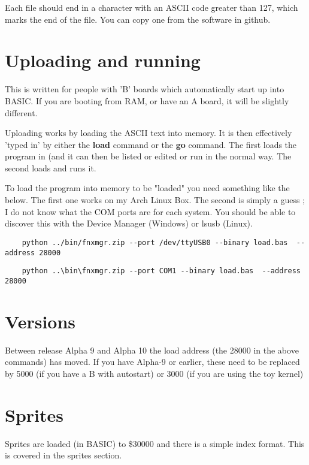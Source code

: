 Each file should end in a character with an ASCII code greater than 127, which marks the end of the file.  You can copy one from the software in github.

\section{Uploading and running}

This is written for people with 'B' boards which automatically start up into BASIC. If you are booting from RAM, or have an A board, it will be slightly different.

Uploading works by loading the ASCII text into memory. It is then effectively 'typed in' by either the \textbf{load} command or the \textbf{go} command. The first loads the program in (and it can then be listed or edited or run in the normal way. The second loads and runs it.

To load the program into memory to be "loaded" you need something like the below. The first one works on my Arch Linux Box. The second is simply a guess ; I do not know what the COM ports are for each system. You should be able to discover this with the Device Manager (Windows) or lsusb (Linux).

\begin{verbatim}
	python ../bin/fnxmgr.zip --port /dev/ttyUSB0 --binary load.bas  --address 28000
\end{verbatim}

\begin{verbatim}
	python ..\bin\fnxmgr.zip --port COM1 --binary load.bas  --address 28000
\end{verbatim}

\section{Versions}

Between release Alpha 9 and Alpha 10 the load address (the 28000 in the above commands) has moved. If you have Alpha-9 or earlier, these need to be replaced by 5000 (if you have a B with autostart) or 3000 (if you are using the toy kernel)

\section{Sprites}
Sprites are loaded (in BASIC) to \$30000 and there is a simple index format. This is covered in the sprites section.
